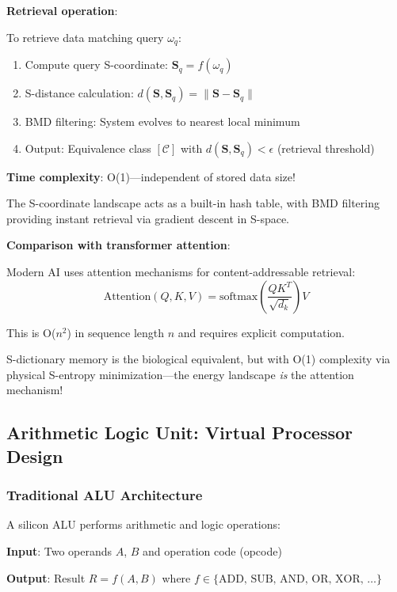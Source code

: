 \documentclass[11pt,a4paper]{article}
\begin{document}
\textbf{Retrieval operation}:

To retrieve data matching query $\omega_q$:
\begin{enumerate}
\item Compute query S-coordinate: $\mathbf{S}_q = f(\omega_q)$
\item S-distance calculation: $d(\mathbf{S}, \mathbf{S}_q) = \|\mathbf{S} - \mathbf{S}_q\|$
\item BMD filtering: System evolves to nearest local minimum
\item Output: Equivalence class $[\mathcal{C}]$ with $d(\mathbf{S}, \mathbf{S}_q) < \epsilon$ (retrieval threshold)
\end{enumerate}

\textbf{Time complexity}: O(1)—independent of stored data size!

The S-coordinate landscape acts as a built-in hash table, with BMD filtering providing instant retrieval via gradient descent in S-space.

\textbf{Comparison with transformer attention}:

Modern AI uses attention mechanisms for content-addressable retrieval\cite{vaswani2017attention}:
\begin{equation}
\text{Attention}(Q, K, V) = \text{softmax}\left(\frac{QK^T}{\sqrt{d_k}}\right)V
\end{equation}

This is O($n^2$) in sequence length $n$ and requires explicit computation.

S-dictionary memory is the biological equivalent, but with O(1) complexity via physical S-entropy minimization—the energy landscape \textit{is} the attention mechanism!

\subsection{Arithmetic Logic Unit: Virtual Processor Design}

\subsubsection{Traditional ALU Architecture}

A silicon ALU performs arithmetic and logic operations\cite{patterson2013computer}:

\textbf{Input}: Two operands $A$, $B$ and operation code (opcode)

\textbf{Output}: Result $R = f(A, B)$ where $f \in \{\text{ADD, SUB, AND, OR, XOR, \ldots}\}$
\end{document}
